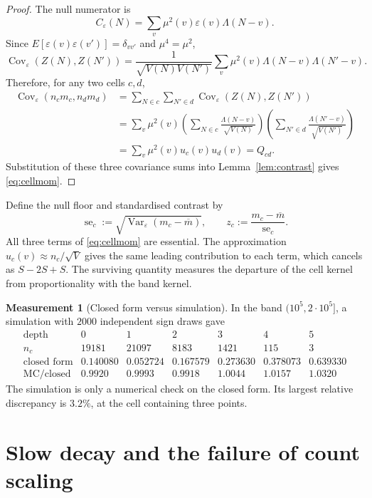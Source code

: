 \documentclass[11pt,a4paper]{article}
\theoremstyle{plain}
\theoremstyle{definition}
\newtheorem{measurement}[theorem]{Measurement}
\theoremstyle{remark}
\begin{document}
\begin{proof}
The null numerator is
\[
 C_{\varepsilon}(N)=\sum_v\mu^2(v)\varepsilon(v)\Lambda(N-v).
\]
Since $E[\varepsilon(v)\varepsilon(v')]=\delta_{vv'}$ and
$\mu^4=\mu^2$,
\[
 \operatorname{Cov}_{\varepsilon}(Z(N),Z(N'))
 =\frac{1}{\sqrt{V(N)V(N')}}
   \sum_v\mu^2(v)\Lambda(N-v)\Lambda(N'-v).
\]
Therefore, for any two cells $c,d$,
\[
\begin{aligned}
 \operatorname{Cov}_{\varepsilon}(n_cm_c,n_dm_d)
 &=\sum_{N\in c}\sum_{N'\in d}
   \operatorname{Cov}_{\varepsilon}(Z(N),Z(N'))\\
 &=\sum_v\mu^2(v)
   \left(\sum_{N\in c}\frac{\Lambda(N-v)}{\sqrt{V(N)}}\right)
   \left(\sum_{N'\in d}\frac{\Lambda(N'-v)}{\sqrt{V(N')}}\right)\\
 &=\sum_v\mu^2(v)u_c(v)u_d(v)=Q_{cd}.
\end{aligned}
\]
Substitution of these three covariance sums into
Lemma~\ref{lem:contrast} gives \eqref{eq:cellmom}.
\end{proof}

Define the null floor and standardised contrast by
\[
 \operatorname{se}_c
 :=\sqrt{\operatorname{Var}_{\varepsilon}(m_c-\overline m)},
 \qquad
 z_c:=\frac{m_c-\overline m}{\operatorname{se}_c}.
\]
All three terms of \eqref{eq:cellmom} are essential.  The approximation
$u_c(v)\approx n_c/\sqrt V$ gives the same leading contribution to each
term, which cancels as $S-2S+S$.  The surviving quantity measures the
departure of the cell kernel from proportionality with the band kernel.

\begin{measurement}[Closed form versus simulation]\label{meas:mc}
In the band $(10^5,2\cdot10^5]$, a simulation with $2000$ independent
sign draws gave
\[
\begin{array}{r|cccccc}
 \text{depth} &0&1&2&3&4&5\\
 n_c&19181&21097&8183&1421&115&3\\\hline
 \text{closed form}&0.140080&0.052724&0.167579&0.273630&0.378073&0.639330\\
 \text{MC}/\text{closed}&0.9920&0.9993&0.9918&1.0044&1.0157&1.0320
\end{array}
\]
The simulation is only a numerical check on the closed form.  Its
largest relative discrepancy is $3.2\%$, at the cell containing three
points.
\end{measurement}

\section{Slow decay and the failure of count scaling}\label{sec:decay}
\end{document}
